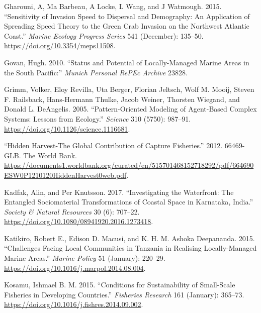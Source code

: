 \documentclass[
]{article}
\newlength{\cslhangindent}
\newlength{\cslentryspacingunit} %
\newenvironment{CSLReferences}[2] %
 {%
  \setlength{\parindent}{0pt}
  \ifodd #1
  \let\oldpar\par
  \def\par{\hangindent=\cslhangindent\oldpar}
  \fi
  \setlength{\parskip}{#2\cslentryspacingunit}
 }%
 {}
\begin{document}
\begin{CSLReferences}{1}{0}
\leavevmode{}%
Gharouni, A, Ma Barbeau, A Locke, L Wang, and J Watmough. 2015. {``Sensitivity of Invasion Speed to Dispersal and Demography: An Application of Spreading Speed Theory to the Green Crab Invasion on the Northwest {Atlantic} Coast.''} \emph{Marine Ecology Progress Series} 541 (December): 135--50. \url{https://doi.org/10.3354/meps11508}.

\leavevmode{}%
Govan, Hugh. 2010. {``Status and Potential of Locally-Managed Marine Areas in the {South} {Pacific}:''} \emph{Munich Personal RePEc Archive} 23828.

\leavevmode{}%
Grimm, Volker, Eloy Revilla, Uta Berger, Florian Jeltsch, Wolf M. Mooij, Steven F. Railsback, Hans-Hermann Thulke, Jacob Weiner, Thorsten Wiegand, and Donald L. DeAngelis. 2005. {``Pattern-{Oriented} {Modeling} of {Agent}-{Based} {Complex} {Systems}: {Lessons} from {Ecology}.''} \emph{Science} 310 (5750): 987--91. \url{https://doi.org/10.1126/science.1116681}.

\leavevmode{}%
{``Hidden {Harvest}-{The} {Global} {Contribution} of {Capture} {Fisheries}.''} 2012. 66469-GLB. The World Bank. \url{https://documents1.worldbank.org/curated/en/515701468152718292/pdf/664690ESW0P1210120HiddenHarvest0web.pdf}.

\leavevmode{}%
Kadfak, Alin, and Per Knutsson. 2017. {``Investigating the {Waterfront}: {The} {Entangled} {Sociomaterial} {Transformations} of {Coastal} {Space} in {Karnataka}, {India}.''} \emph{Society \& Natural Resources} 30 (6): 707--22. \url{https://doi.org/10.1080/08941920.2016.1273418}.

\leavevmode{}%
Katikiro, Robert E., Edison D. Macusi, and K. H. M. Ashoka Deepananda. 2015. {``Challenges Facing Local Communities in {Tanzania} in Realising Locally-Managed Marine Areas.''} \emph{Marine Policy} 51 (January): 220--29. \url{https://doi.org/10.1016/j.marpol.2014.08.004}.

\leavevmode{}%
Kosamu, Ishmael B. M. 2015. {``Conditions for Sustainability of Small-Scale Fisheries in Developing Countries.''} \emph{Fisheries Research} 161 (January): 365--73. \url{https://doi.org/10.1016/j.fishres.2014.09.002}.


\end{CSLReferences}
\end{document}
